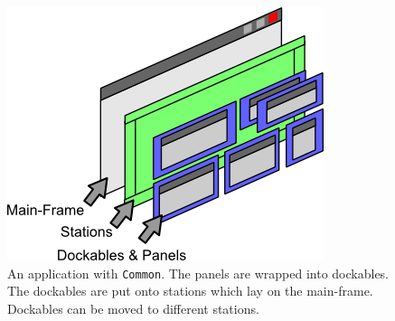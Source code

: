 \documentclass[a4paper,10pt]{article}
\newcommand{\src}[1]{\texttt{#1}}
\begin{document}
\begin{figure}[ht]
\centering
\includegraphics[scale=1]{app_with}
\caption{An application with \src{Common}. The panels are wrapped into dockables. The dockables are put onto stations which lay on the main-frame. Dockables can be moved to different stations.}
\label{fig:app_with}
\end{figure}
\end{document}

